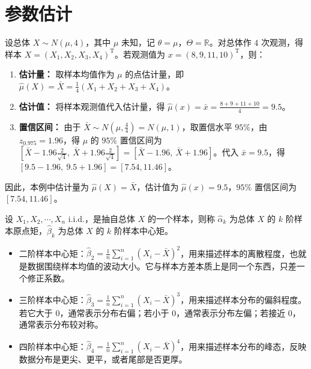 \chapter{参数估计}
\begin{example}
设总体 \(X\sim N(\mu,4)\)，其中 \(\mu\) 未知，记 \(\theta=\mu\)，\(\Theta=\mathbb{R}\)。对总体作 \(4\) 次观测，得样本 \(X=(X_1,X_2,X_3,X_4)^{\mathrm T}\)。若观测值为 \(x=(8,9,11,10)^{\mathrm T}\)，则：
\begin{enumerate}
    \item \textbf{估计量：} 取样本均值作为 \(\mu\) 的点估计量，即 \(\hat{\mu}(X)=\bar X=\frac{1}{4}(X_1+X_2+X_3+X_4)\)。

    \item \textbf{估计值：} 将样本观测值代入估计量，得 \(\hat{\mu}(x)=\bar x=\frac{8+9+11+10}{4}=9.5\)。

    \item \textbf{置信区间：} 由于 \(\bar X\sim N\left(\mu,\frac{4}{4}\right)=N(\mu,1)\)，取置信水平 \(95\%\)，由 \(z_{0.975}=1.96\)，得 \(\mu\) 的 \(95\%\) 置信区间为 \([\bar X-1.96\frac{2}{\sqrt{4}},\ \bar X+1.96\frac{2}{\sqrt{4}}]=[\bar X-1.96,\ \bar X+1.96]\)。代入 \(\bar x=9.5\)，得 \([9.5-1.96,\ 9.5+1.96]=[7.54,11.46]\)。
\end{enumerate}
因此，本例中估计量为 \(\hat{\mu}(X)=\bar X\)，估计值为 \(\hat{\mu}(x)=9.5\)，\(95\%\) 置信区间为 \([7.54,11.46]\)。
\end{example}
\begin{definition}[样本中心矩]
设 \(X_1,X_2,\cdots,X_n\) i.i.d.，是抽自总体 \(X\) 的一个样本，则称 \(\hat{\alpha}_k\) 为总体 \(X\) 的 \(k\) 阶样本原点矩，\(\hat{\beta}_k\) 为总体 \(X\) 的 \(k\) 阶样本中心矩。
\end{definition}
\begin{note}
    \begin{itemize}
    \item 二阶样本中心矩：\(\hat{\beta}_2=\frac{1}{n}\sum_{i=1}^n (X_i-\bar X)^2\)，用来描述样本的离散程度，也就是数据围绕样本均值的波动大小。它与样本方差本质上是同一个东西，只差一个修正系数。

    \item 三阶样本中心矩：\(\hat{\beta}_3=\frac{1}{n}\sum_{i=1}^n (X_i-\bar X)^3\)，用来描述样本分布的偏斜程度。若它大于 \(0\)，通常表示分布右偏；若小于 \(0\)，通常表示分布左偏；若接近 \(0\)，通常表示分布较对称。

    \item 四阶样本中心矩：\(\hat{\beta}_4=\frac{1}{n}\sum_{i=1}^n (X_i-\bar X)^4\)，用来描述样本分布的峰态，反映数据分布是更尖、更平，或者尾部是否更厚。
\end{itemize}
\end{note}
